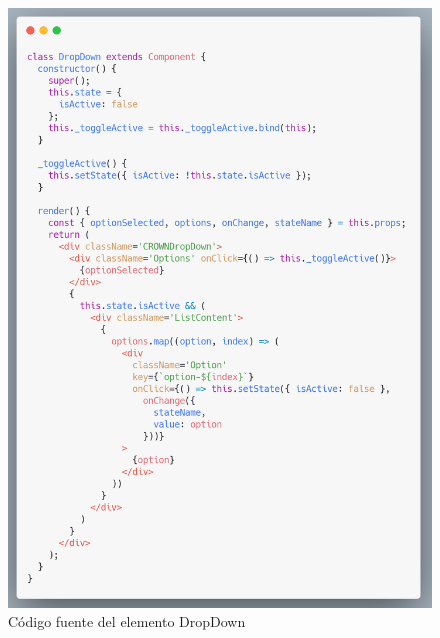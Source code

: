     \begin{figure}[H]
    \includegraphics[width=1\textwidth]{./Imagenes/8.30.png}
    \caption[Código fuente del elemento DropDown]{Código fuente del elemento DropDown}
    \end{figure}
\clearpage


